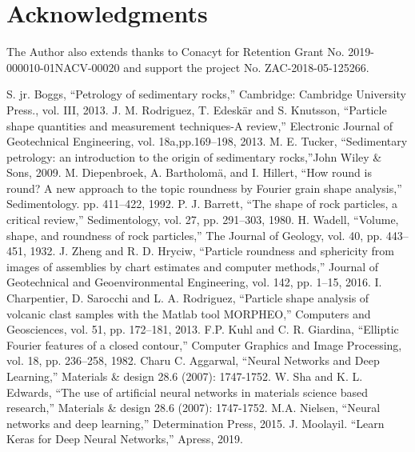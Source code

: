 \documentclass[conference]{IEEEtran}
\begin{document}
\section*{Acknowledgments}

The Author also extends thanks to Conacyt for Retention Grant No. 2019-000010-01NACV-00020 and support the project No. ZAC-2018-05-125266. 

	
\begin{thebibliography}{plain}
 S. jr. Boggs, ``Petrology of sedimentary rocks,'' Cambridge: Cambridge University Press., vol. III, 2013.
 J. M. Rodriguez, T. Edesk{\"{a}}r and S. Knutsson, ``Particle shape quantities and measurement techniques-A review,'' Electronic Journal of Geotechnical Engineering, vol. 18a,pp.169--198, 2013.
 M. E. Tucker, ``Sedimentary petrology: an introduction to the origin of sedimentary rocks,''John Wiley \& Sons, 2009.
 M. Diepenbroek, A. Bartholom{\"{a}}, and I. Hillert, ``How round is round? A new approach to the topic  roundness by Fourier grain shape analysis,'' Sedimentology. pp. 411--422, 1992.
 P. J. Barrett, ``The shape of rock particles, a critical review,'' Sedimentology, vol. 27, pp. 291--303, 1980.
 H. Wadell, ``Volume, shape, and roundness of rock particles,'' The Journal of Geology, vol. 40, pp. 443--451, 1932.
 J. Zheng and R. D. Hryciw, ``Particle roundness and sphericity from images of assemblies by chart estimates and computer methods,'' Journal of Geotechnical and Geoenvironmental Engineering, vol. 142, pp. 1--15, 2016.
 I. Charpentier,  D. Sarocchi  and L. A. Rodriguez, ``Particle shape analysis of volcanic clast samples with the Matlab tool MORPHEO,'' Computers and Geosciences, vol. 51, pp. 172--181, 2013.
 F.P. Kuhl and C. R. Giardina, ``Elliptic Fourier features of a closed contour,'' Computer Graphics and Image Processing, vol. 18, pp. 236--258, 1982.
  Charu C. Aggarwal, ``Neural Networks and Deep Learning,'' Materials \& design 28.6 (2007): 1747-1752.
 W. Sha and K. L. Edwards, ``The use of artificial neural networks in materials science based research,'' Materials \& design 28.6 (2007): 1747-1752.
 M.A. Nielsen, ``Neural networks and deep learning,'' Determination Press, 2015.
 J. Moolayil. ``Learn Keras for Deep Neural Networks,'' Apress, 2019.

\end{thebibliography}

\end{document}
